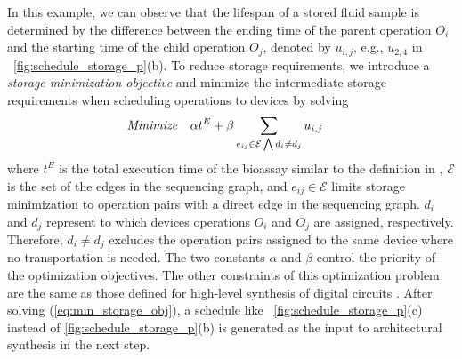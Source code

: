 In this example, we can observe that
the lifespan of a stored fluid sample is determined by the difference between
the ending time of the parent operation $O_i$ and the starting time of the child
operation $O_j$, denoted by $u_{i,j}$,  e.g., $u_{2,4}$ in \figname~\ref{fig:schedule_storage_p}(b).
%
To reduce storage requirements, we introduce a \textit{storage
minimization objective} and minimize the intermediate storage requirements
when scheduling operations to devices by solving
%
\begin{align} 
\text{\textit{Minimize}} & \quad \alpha t^E+\beta\sum_{e_{ij}\in
\mathcal{E}\bigwedge d_i\ne
d_j }u_{i,j} 
 \label{eq:min_storage_obj}
\end{align}
where $t^E$ is the total execution time of the bioassay similar to the
definition in
\cite{Micheli94}, %
$\mathcal{E}$ is the set of the edges in the sequencing graph, and 
$e_{ij}\in \mathcal{E}$ limits storage minimization to operation pairs with a direct
edge in the sequencing graph.
$d_i$ and $d_j$ represent to which devices operations $O_i$ and $O_j$ are
assigned, respectively. Therefore, $d_i \ne d_j $ excludes the operation pairs assigned to the same device
where no transportation is needed.
The two constants $\alpha$ and $\beta$ 
control the priority of the optimization objectives. The other
constraints of this optimization problem are the same as those defined 
for high-level synthesis of digital circuits \cite{Micheli94}. 
After solving (\ref{eq:min_storage_obj}), 
a schedule
like \figname~\ref{fig:schedule_storage_p}(c) instead of 
\ref{fig:schedule_storage_p}(b) is generated as the input to architectural
synthesis in the next step.


